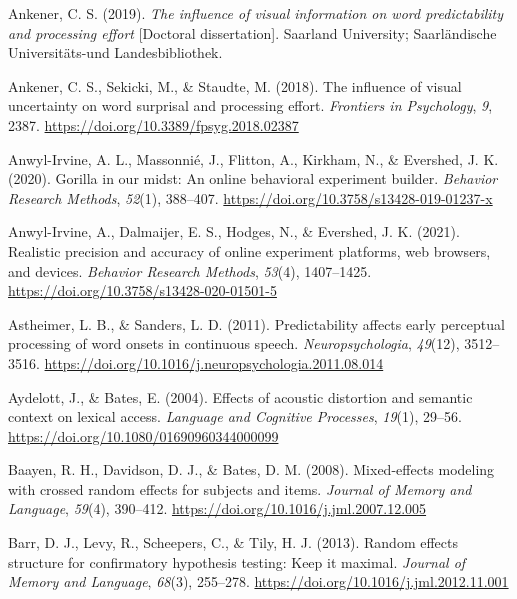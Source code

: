 \documentclass[a4paper, nobind]{templates/ociamthesis}
\newlength{\cslhangindent}
\newenvironment{CSLReferences}[2] %
 {%
  \setlength{\parindent}{0pt}
  \ifodd #1
  \let\oldpar\par
  \def\par{\hangindent=\cslhangindent\oldpar}
  \fi
  \setlength{\parskip}{1mm}
  \setlength{\baselineskip}{6mm}
 }%
 {}
\begin{document}
\begin{CSLReferences}{1}{0}
\leavevmode{}%
Ankener, C. S. (2019). \emph{{The influence of visual information on word predictability and processing effort}} {[}Doctoral dissertation{]}. Saarland University; Saarl{ä}ndische Universit{ä}ts-und Landesbibliothek.

\leavevmode{}%
Ankener, C. S., Sekicki, M., \& Staudte, M. (2018). {The influence of visual uncertainty on word surprisal and processing effort}. \emph{Frontiers in Psychology}, \emph{9}, 2387. \url{https://doi.org/10.3389/fpsyg.2018.02387}

\leavevmode{}%
Anwyl-Irvine, A. L., Massonnié, J., Flitton, A., Kirkham, N., \& Evershed, J. K. (2020). {Gorilla in our midst: An online behavioral experiment builder}. \emph{Behavior Research Methods}, \emph{52}(1), 388--407. \url{https://doi.org/10.3758/s13428-019-01237-x}

\leavevmode{}%
Anwyl-Irvine, A., Dalmaijer, E. S., Hodges, N., \& Evershed, J. K. (2021). {Realistic precision and accuracy of online experiment platforms, web browsers, and devices}. \emph{Behavior Research Methods}, \emph{53}(4), 1407--1425. \url{https://doi.org/10.3758/s13428-020-01501-5}

\leavevmode{}%
Astheimer, L. B., \& Sanders, L. D. (2011). {Predictability affects early perceptual processing of word onsets in continuous speech}. \emph{Neuropsychologia}, \emph{49}(12), 3512--3516. \url{https://doi.org/10.1016/j.neuropsychologia.2011.08.014}

\leavevmode{}%
Aydelott, J., \& Bates, E. (2004). {Effects of acoustic distortion and semantic context on lexical access}. \emph{Language and Cognitive Processes}, \emph{19}(1), 29--56. \url{https://doi.org/10.1080/01690960344000099}

\leavevmode{}%
Baayen, R. H., Davidson, D. J., \& Bates, D. M. (2008). {Mixed-effects modeling with crossed random effects for subjects and items}. \emph{Journal of Memory and Language}, \emph{59}(4), 390--412. \url{https://doi.org/10.1016/j.jml.2007.12.005}

\leavevmode{}%
Barr, D. J., Levy, R., Scheepers, C., \& Tily, H. J. (2013). Random effects structure for confirmatory hypothesis testing: Keep it maximal. \emph{Journal of Memory and Language}, \emph{68}(3), 255--278. \url{https://doi.org/10.1016/j.jml.2012.11.001}


\end{CSLReferences}
\end{document}
